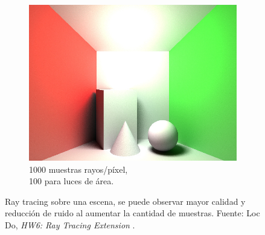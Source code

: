 \begin{figure}[H]
	\begin{subfigure}{0.33\textwidth}
		\centering
		\includegraphics[width=.98\linewidth]{media/ray_1000s.jpg}
		\captionsetup{width=0.98\textwidth, justification=centering}
		\caption*{1000 muestras rayos/píxel,\\ 100 para luces de área.}
	\end{subfigure}
	\caption{Ray tracing sobre una escena, se puede observar mayor calidad y reducción de ruido al aumentar la cantidad de muestras. Fuente: Loc Do, \emph{HW6: Ray Tracing Extension} \cite{locdoraytracing}.}
	\label{fig:ray_tracing_nsamples}
\end{figure}